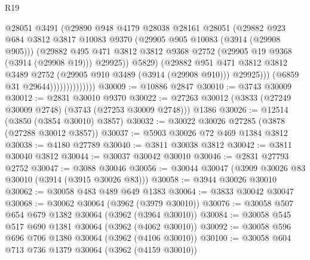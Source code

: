 \begin{lexlean}{R19}
\begin{coremodule}
                                  @28051
                                  @3491
                                  (@29890
                                    @948
                                    @4179
                                    @28038
                                    @28161
                                    @28051
                                    (@29882
                                      @923
                                      @684
                                      @3812
                                      @3817
                                      @10083
                                      @9370
                                      (@29905 @905 @10083 (@3914 (@29908 @905)))
                                      (@29882
                                        @495
                                        @471
                                        @3812
                                        @3812
                                        @9368
                                        @2752
                                        (@29905 @19 @9368 (@3914 (@29908 @19)))
                                        @29925))
                                    @5829)
                                  (@29882
                                    @951
                                    @471
                                    @3812
                                    @3812
                                    @3489
                                    @2752
                                    (@29905 @910 @3489 (@3914 (@29908 @910)))
                                    @29925)))
                              (@6859 @31 @29644))))))))))))))
@30009 := @10886 @2847
@30010 := @3743 @30009
@30012 := @2831 @30010 @9370
@30022 := @27263 @30012 (@3833 (@27249 @30009 @2748) (@3743 (@27253 @30009 @2748))) @1386
@30026 := @12514 (@3850 (@3854 @30010) @3857)
@30032 := @30022 @30026 @27285 (@3878 (@27288 @30012 @3857))
@30037 := @5903 @30026 @72 @469 @1384 @3812
@30038 := @4180 @27789
@30040 := @3811 @30038 @3812
@30042 := @3811 @30040 @3812
@30044 := @30037 @30042 @30010
@30046 := @2831 @27793 @2752
@30047 := @3088 @30046
@30056 := @30044 @30047 (@3909 @30026 @83 @30010 (@3914 (@3915 @30026 @83)))
@30058 := @3944 @30026 @30010
@30062 := @30058 @483 @489 @649 @1383
@30064 := @3833 @30042 @30047
@30068 := @30062 @30064 (@3962 (@3979 @30010))
@30076 := @30058 @507 @654 @679 @1382 @30064 (@3962 (@3964 @30010))
@30084 := @30058 @545 @517 @690 @1381 @30064 (@3962 (@4062 @30010))
@30092 := @30058 @596 @696 @706 @1380 @30064 (@3962 (@4106 @30010))
@30100 := @30058 @604 @713 @736 @1379 @30064 (@3962 (@4159 @30010))

\end{coremodule}
\end{lexlean}
